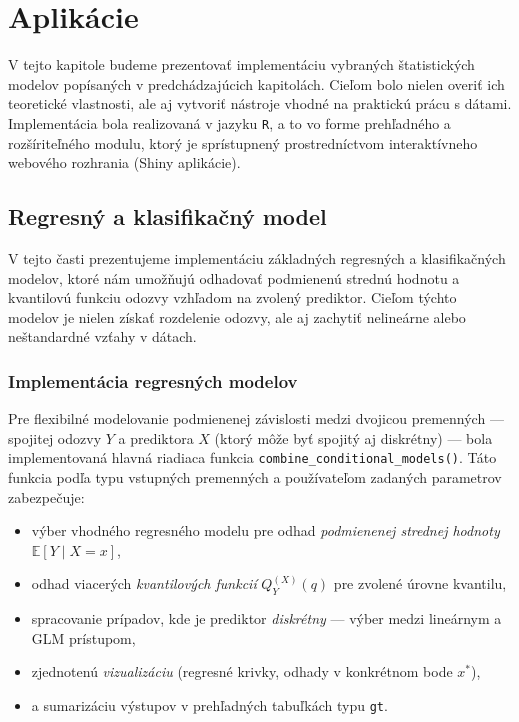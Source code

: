 \chapter{Aplikácie}\label{chap:applications}

V tejto kapitole budeme prezentovať implementáciu vybraných štatistických modelov popísaných v predchádzajúcich kapitolách. Cieľom bolo nielen overiť ich teoretické vlastnosti, ale aj vytvoriť nástroje vhodné na praktickú prácu s dátami. Implementácia bola realizovaná v jazyku \texttt{R}, a to vo forme prehľadného a rozšíriteľného modulu, ktorý je sprístupnený prostredníctvom interaktívneho webového rozhrania (Shiny aplikácie).

\section{Regresný a klasifikačný model}\label{sec:app_regression_class}

V tejto časti prezentujeme implementáciu základných regresných a klasifikačných modelov, ktoré nám umožňujú odhadovať podmienenú strednú hodnotu a kvantilovú funkciu odozvy vzhľadom na zvolený prediktor. Cieľom týchto modelov je nielen získať rozdelenie odozvy, ale aj zachytiť nelineárne alebo neštandardné vzťahy v dátach.

\subsection{Implementácia regresných modelov}\label{subsec:regression_implementation}

Pre flexibilné modelovanie podmienenej závislosti medzi dvojicou premenných — spojitej odozvy $Y$ a prediktora $X$ (ktorý môže byť spojitý aj diskrétny) — bola implementovaná hlavná riadiaca funkcia \texttt{combine\_conditional\_models()}. Táto funkcia podľa typu vstupných premenných a používateľom zadaných parametrov zabezpečuje:

\begin{itemize}
  \setlength{\itemsep}{0pt}
  \setlength{\parskip}{0pt}
  \item výber vhodného regresného modelu pre odhad \textit{podmienenej strednej hodnoty} $\mathbb{E}[Y \mid X = x]$,
  \item odhad viacerých \textit{kvantilových funkcií} $Q_Y^{(X)}(q)$ pre zvolené úrovne kvantilu,
  \item spracovanie prípadov, kde je prediktor \textit{diskrétny} — výber medzi lineárnym a GLM prístupom,
  \item zjednotenú \textit{vizualizáciu} (regresné krivky, odhady v konkrétnom bode $x^*$),
  \item a sumarizáciu výstupov v prehľadných tabuľkách typu \texttt{gt}.
\end{itemize}

